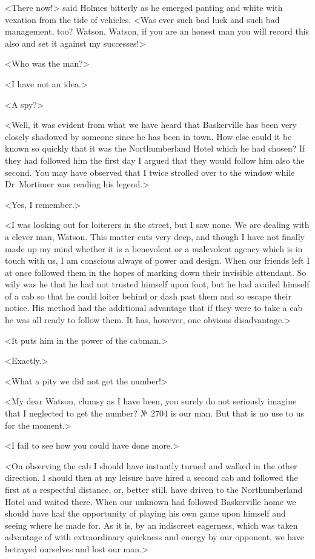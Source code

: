 <There now!> said Holmes bitterly as he emerged panting and white with vexation from the tide of vehicles. <Was ever such bad luck and such bad management, too? Watson, Watson, if you are an honest man you will record this also and set it against my successes!>

<Who was the man?>

<I have not an idea.>

<A spy?>

<Well, it was evident from what we have heard that Baskerville has been very closely shadowed by someone since he has been in town. How else could it be known so quickly that it was the Northumberland Hotel which he had chosen? If they had followed him the first day I argued that they would follow him also the second. You may have observed that I twice strolled over to the window while Dr~Mortimer was reading his legend.>

<Yes, I remember.>

<I was looking out for loiterers in the street, but I saw none. We are dealing with a clever man, Watson. This matter cuts very deep, and though I have not finally made up my mind whether it is a benevolent or a malevolent agency which is in touch with us, I am conscious always of power and design. When our friends left I at once followed them in the hopes of marking down their invisible attendant. So wily was he that he had not trusted himself upon foot, but he had availed himself of a cab so that he could loiter behind or dash past them and so escape their notice. His method had the additional advantage that if they were to take a cab he was all ready to follow them. It has, however, one obvious disadvantage.>

<It puts him in the power of the cabman.>

<Exactly.>

<What a pity we did not get the number!>

<My dear Watson, clumsy as I have been, you surely do not seriously imagine that I neglected to get the number? № 2704 is our man. But that is no use to us for the moment.>

<I fail to see how you could have done more.>

<On observing the cab I should have instantly turned and walked in the other direction. I should then at my leisure have hired a second cab and followed the first at a respectful distance, or, better still, have driven to the Northumberland Hotel and waited there. When our unknown had followed Baskerville home we should have had the opportunity of playing his own game upon himself and seeing where he made for. As it is, by an indiscreet eagerness, which was taken advantage of with extraordinary quickness and energy by our opponent, we have betrayed ourselves and lost our man.>

